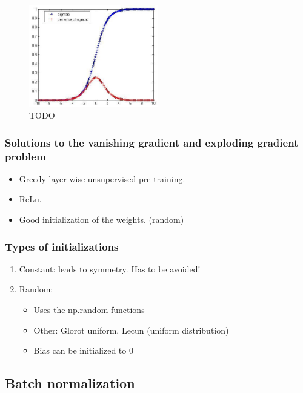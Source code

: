 \documentclass{article}
\begin{document}
\begin{figure}[H]
    \centering
    \includegraphics[width=0.5\textwidth]{img/vanishing-exploding-gradient.png}
    \caption{TODO}
\end{figure}

\subsubsection{Solutions to the vanishing gradient and exploding gradient problem}

\begin{itemize}
    \item Greedy layer-wise unsupervised pre-training.
    \item ReLu.
    \item Good initialization of the weights. (random)
\end{itemize}

\subsubsection{Types of initializations}

\begin{enumerate}
    \item Constant: leads to symmetry. Has to be avoided!
    \item Random:
    \begin{itemize}
        \item Uses the np.random functions
        \item Other: Glorot uniform, Lecun (uniform distribution)
        \item Bias can be initialized to 0
    \end{itemize}
\end{enumerate}

\subsection{Batch normalization}
\end{document}
